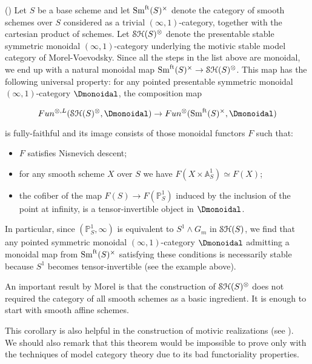\begin{refsection}
\begin{cor}(\cite[5.11]{nc1})
Let $S$ be a base scheme and let $\mathrm{Sm}^\mathrm{ft}(S)^{\times}$ denote the category of smooth schemes over $S$ considered as a trivial $(\infty,1)$-category, together with the cartesian product of schemes. Let $\mathcal{S}\mathcal{H}(S)^{\otimes}$ denote the presentable stable symmetric monoidal $(\infty,1)$-category underlying the motivic stable model category of Morel-Voevodsky. Since all the steps in the list above are monoidal, we end up with a natural monoidal map $\mathrm{Sm}^\mathrm{ft}(S)^{\times}\to \mathcal{S}\mathcal{H}(S)^{\otimes}$. This map has the following universal property: for any pointed presentable symmetric monoidal $(\infty,1)$-category $\Dmonoidal$, the composition map


$$Fun^{\otimes, L}(\stmonoidal , \Dmonoidal)\to Fun^{\otimes}(\sch^{\times}, \Dmonoidal)$$

\noindent is fully-faithful and its image consists of those monoidal functors $F$ such that:

\begin{itemize}
\item $F$ satisfies Nisnevich descent;
\item for any smooth scheme $X$ over $S$ we have $F(X\times \mathbb{A}^1_S)\simeq F(X)$;
\item the cofiber of the map $F(S)\to F(\mathbb{P}^1_S)$ induced by the inclusion of the point at infinity, is a tensor-invertible object in $\Dmonoidal$.
\end{itemize}

In particular, since $(\mathbb{P}^1_S, \infty)$ is equivalent to $S^1\wedge G_m$ in $\mathcal{S}\mathcal{H}(S)$, we find that any pointed symmetric monoidal $(\infty,1)$-category $\Dmonoidal$ admitting a monoidal map from $\mathrm{Sm}^\mathrm{ft}(S)^{\times}$ satisfying these conditions is necessarily stable because $S^1$ becomes tensor-invertible (see the example above).
\end{cor}

\begin{remark}
An important result by Morel \cite{MR1693330} is that the construction of $\mathcal{S}\mathcal{H}(S)^{\otimes}$ does not required the category of all smooth schemes as a basic ingredient. It is enough to start with smooth affine schemes.\\
\end{remark}


This corollary is also helpful in the construction of motivic realizations (see \cite{brad-thesis}). \\

We should also remark that this theorem would be impossible to prove only with the techniques of model category theory due to its bad functoriality properties.\\


\end{refsection}
